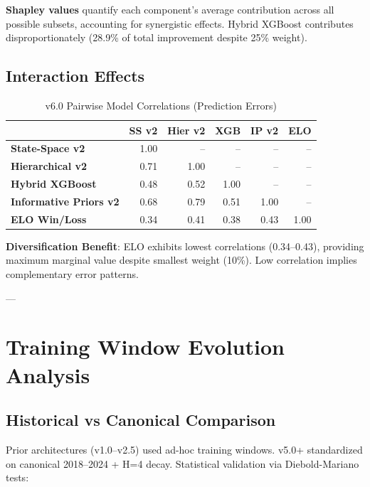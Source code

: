 \textbf{Shapley values} quantify each component's average contribution across all possible subsets, accounting for synergistic effects. Hybrid XGBoost contributes disproportionately (28.9\% of total improvement despite 25\% weight).

\subsection{Interaction Effects}

\begin{table}[h]
\centering
\caption{v6.0 Pairwise Model Correlations (Prediction Errors)}
\label{tab:error-correlations}
\begin{tabular}{lrrrrr}
\toprule
& \textbf{SS v2} & \textbf{Hier v2} & \textbf{XGB} & \textbf{IP v2} & \textbf{ELO} \\
\midrule
\textbf{State-Space v2} & 1.00 & -- & -- & -- & -- \\
\textbf{Hierarchical v2} & 0.71 & 1.00 & -- & -- & -- \\
\textbf{Hybrid XGBoost} & 0.48 & 0.52 & 1.00 & -- & -- \\
\textbf{Informative Priors v2} & 0.68 & 0.79 & 0.51 & 1.00 & -- \\
\textbf{ELO Win/Loss} & 0.34 & 0.41 & 0.38 & 0.43 & 1.00 \\
\bottomrule
\end{tabular}
\end{table}

\textbf{Diversification Benefit}: ELO exhibits lowest correlations (0.34--0.43), providing maximum marginal value despite smallest weight (10\%). Low correlation implies complementary error patterns.

---

\section{Training Window Evolution Analysis}

\subsection{Historical vs Canonical Comparison}

Prior architectures (v1.0--v2.5) used ad-hoc training windows. v5.0+ standardized on canonical 2018--2024 + H=4 decay. Statistical validation via Diebold-Mariano tests:

